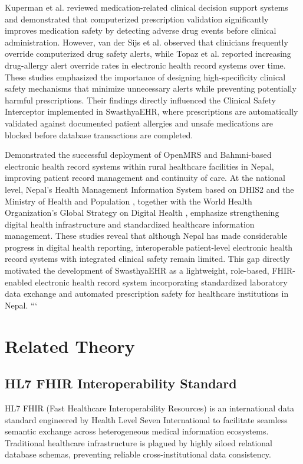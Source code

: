 \documentclass[12pt, a4paper]{report}
\numberwithin{equation}{chapter}
\begin{document}
Kuperman et al. \cite{kuperman} reviewed medication-related clinical decision support systems and demonstrated that computerized prescription validation significantly improves medication safety by detecting adverse drug events before clinical administration. However, van der Sijs et al. \cite{vandersijs} observed that clinicians frequently override computerized drug safety alerts, while Topaz et al. \cite{topaz} reported increasing drug-allergy alert override rates in electronic health record systems over time. These studies emphasized the importance of designing high-specificity clinical safety mechanisms that minimize unnecessary alerts while preventing potentially harmful prescriptions. Their findings directly influenced the Clinical Safety Interceptor implemented in SwasthyaEHR, where prescriptions are automatically validated against documented patient allergies and unsafe medications are blocked before database transactions are completed.

\cite{possible} Demonstrated the successful deployment of OpenMRS and Bahmni-based electronic health record systems within rural healthcare facilities in Nepal, improving patient record management and continuity of care. At the national level, Nepal's Health Management Information System based on DHIS2 \cite{dhis2} and the Ministry of Health and Population \cite{mohp}, together with the World Health Organization's Global Strategy on Digital Health \cite{who}, emphasize strengthening digital health infrastructure and standardized healthcare information management. These studies reveal that although Nepal has made considerable progress in digital health reporting, interoperable patient-level electronic health record systems with integrated clinical safety remain limited. This gap directly motivated the development of SwasthyaEHR as a lightweight, role-based, FHIR-enabled electronic health record system incorporating standardized laboratory data exchange and automated prescription safety for healthcare institutions in Nepal.
```

\section{Related Theory}

\subsection{HL7 FHIR Interoperability Standard}
HL7 FHIR (Fast Healthcare Interoperability Resources) is an international data standard engineered by Health Level Seven International to facilitate seamless semantic exchange across heterogeneous medical information ecosystems. Traditional healthcare infrastructure is plagued by highly siloed relational database schemas, preventing reliable cross-institutional data consistency. 
\end{document}
